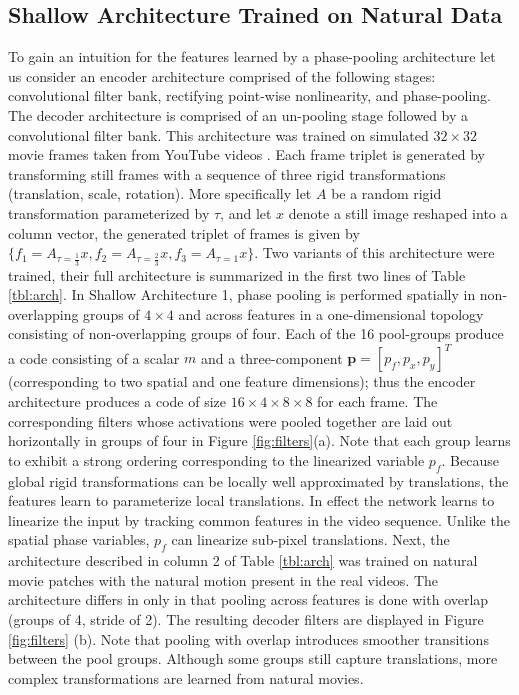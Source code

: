 \documentclass{article} %
\begin{document}
\subsection{Shallow Architecture Trained on Natural Data}
To gain an intuition for the features learned by a phase-pooling architecture let us consider an encoder architecture comprised of the following stages: convolutional filter bank,   rectifying point-wise nonlinearity, and phase-pooling. The decoder architecture is comprised of an un-pooling stage followed by a convolutional filter bank. This architecture was trained on simulated $32 \times 32$ movie frames taken from YouTube videos \cite{slowAE}. Each frame triplet is generated by transforming still frames with a sequence of three rigid transformations (translation, scale, rotation). More specifically let $A$ be a random rigid transformation parameterized by $\tau$, and let $x$ denote a still image reshaped into a column vector, the generated triplet of frames is given by $\{f_1=A_{\tau=\frac{1}{3}}x,f_2=A_{\tau=\frac{2}{3}}x,f_3=A_{\tau=1}x\}$. Two variants of this architecture were trained, their full architecture is summarized in the first two lines of Table \ref{tbl:arch}. In Shallow Architecture 1, phase pooling is performed spatially in non-overlapping groups of $4\times4$ and across features in a one-dimensional topology consisting of non-overlapping groups of four. Each of the 16 pool-groups produce a code consisting of a scalar $m$ and a three-component $\mathbf p = [p_f,p_x,p_y]^T$ (corresponding to two spatial and one feature dimensions); thus the encoder architecture produces a code of size $16 \times 4 \times 8 \times 8$ for each frame. The corresponding filters whose activations were pooled together are laid out horizontally in groups of four in Figure \ref{fig:filters}(a). Note that each group learns to exhibit a strong ordering corresponding to the linearized variable $p_f$. Because global rigid transformations can be locally well approximated by translations, the features learn to parameterize local translations. In effect the network learns to linearize the input by tracking common features in the video sequence. Unlike the spatial phase variables, $p_f$ can linearize sub-pixel translations. Next, the architecture described in column 2 of Table \ref{tbl:arch} was trained on natural movie patches with the natural motion present in the real videos. The architecture differs in only in that pooling across features is done with overlap (groups of 4, stride of 2). The resulting decoder filters are displayed in Figure \ref{fig:filters} (b). Note that pooling with overlap introduces smoother transitions between the pool groups. Although some groups still capture translations, more complex transformations are learned from natural movies. 
\end{document}
